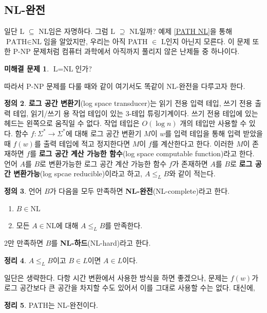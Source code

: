 \documentclass[a4paper, 11pt]{article}
\theoremstyle{definition}
\newtheorem{defn}{정의}[section]
\newtheorem{thm}[defn]{정리}
\newtheorem{oq}[defn]{미해결 문제}
\newenvironment{pf*}{\pushQED{\qed}\pf}
{\popQED\endpf}
\begin{document}
\subsection{NL-완전}
일단 L $\subseteq$ NL임은 자명하다. 그럼 L $\supseteq$ NL일까? 예제 \ref{PATH NL}을 통해 $\text{PATH} \in \text{NL}$임을 알았지만, 우리는 아직 PATH $\in$ L인지 아닌지 모른다. 이 문제 또한 P-NP 문제처럼 컴퓨터 과학에서 아직까지 풀리지 않은 난제들 중 하나이다.
\begin{oq}
     $\text{L} =\text{NL}$인가?
\end{oq}
따라서 P-NP 문제를 다룰 때와 같이 여기서도 똑같이 NL-완전을 다루고자 한다.
\begin{defn}
    \textbf{로그 공간 변환기}(log space transducer)는 읽기 전용 입력 테입, 쓰기 전용 출력 테입, 읽기/쓰기 용 작업 테입이 있는 3-테입 튜링기계이다. 쓰기 전용 테입에 있는 헤드는 왼쪽으로 움직일 수 없다. 작업 테입은 $O(\log n)$ 개의 테입만 사용할 수 있다. 함수 $f: \Sigma^* \rightarrow \Sigma^*$에 대해 로그 공간 변환기 $M$이 $w$를 입력 테입을 통해 입력 받았을 때 $f(w)$를 출력 테입에 적고 정지한다면 $M$이 $f$를 계산한다고 한다. 이러한 $M$이 존재하면 $f$를 \textbf{로그 공간 계산 가능한 함수}(log space computable function)라고 한다. 언어 $A$를 $B$로 변환가능한 로그 공간 계산 가능한 함수 $f$가 존재하면 $A$를 $B$로 \textbf{로그 공간 변환가능}(log spcae reducible)이라고 하고, $A \le_L B$와 같이 적는다.
\end{defn}
\begin{defn}
    언어 $B$가 다음을 모두 만족하면 \textbf{NL-완전}(NL-complete)라고 한다.
    \begin{enumerate}
        \item $B \in \text{NL}$
        \item 모든 $A \in \text{NL}$에 대해 $A \le_L B$를 만족한다.
    \end{enumerate}
    2만 만족하면 $B$를 \textbf{NL-하드}(NL-hard)라고 한다.
\end{defn}
\begin{thm}
    $A \le_L B$이고 $B \in L$이면 $A \in L$이다.
\end{thm}
\begin{pf*}
    일단은 생략한다.
    다항 시간 변환에서 사용한 방식을 하면 좋겠으나, 문제는 $f(w)$가 로그 공간보다 큰 공간을 차지할 수도 있어서 이를 그대로 사용할 수는 없다. 대신에,
\end{pf*}
\begin{thm}
    PATH는 NL-완전이다.
\end{thm}
\end{document}
